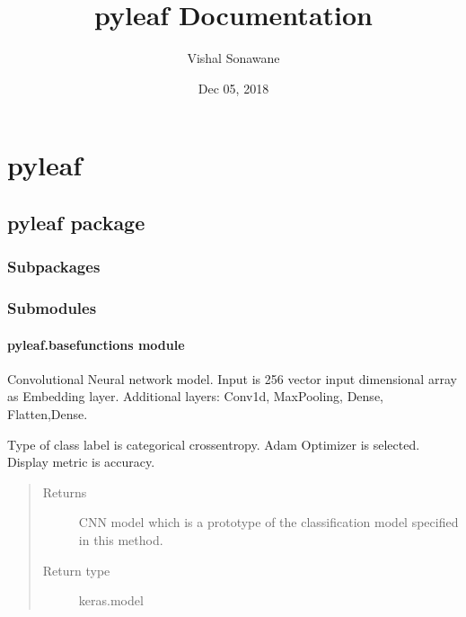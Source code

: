 \documentclass[letterpaper,10pt,english]{sphinxmanual}
\title{pyleaf Documentation}
\date{Dec 05, 2018}
\author{Vishal Sonawane}
\begin{document}
\pagestyle{empty}
\maketitle
\pagestyle{plain}
\sphinxtableofcontents
\pagestyle{normal}
\label{\detokenize{index::doc}}



\chapter{pyleaf}
\label{\detokenize{modules:pyleaf}}\label{\detokenize{modules::doc}}

\section{pyleaf package}
\label{\detokenize{pyleaf:pyleaf-package}}\label{\detokenize{pyleaf::doc}}

\subsection{Subpackages}
\label{\detokenize{pyleaf:subpackages}}

\subsection{Submodules}
\label{\detokenize{pyleaf:submodules}}

\subsubsection{pyleaf.basefunctions module}
\label{\detokenize{pyleaf.basefunctions:module-pyleaf.basefunctions}}\label{\detokenize{pyleaf.basefunctions:pyleaf-basefunctions-module}}\label{\detokenize{pyleaf.basefunctions::doc}}

\begin{fulllineitems}
\label{\detokenize{pyleaf.basefunctions:pyleaf.basefunctions.CNNModel}}
Convolutional Neural network model.
Input is 256 vector input dimensional array as Embedding layer.
Additional layers: Conv1d, MaxPooling, Dense, Flatten,Dense.

Type of class label is categorical crossentropy. Adam Optimizer is selected. Display metric is accuracy.
\begin{quote}\begin{description}
\item[{Returns}] \leavevmode
CNN model which is a prototype of the classification model specified in this method.

\item[{Return type}] \leavevmode
keras.model

\end{description}\end{quote}

\end{fulllineitems}
\end{document}
